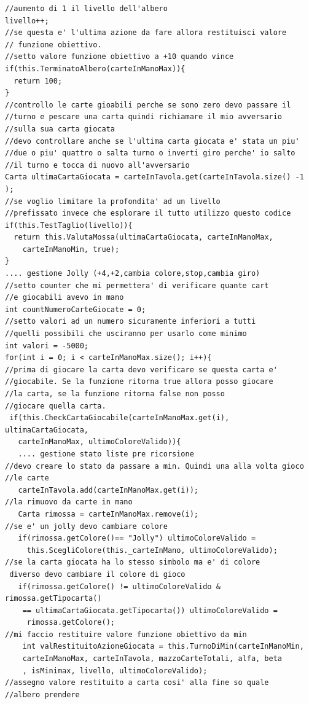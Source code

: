 \begin{lstlisting}
//aumento di 1 il livello dell'albero
livello++;
//se questa e' l'ultima azione da fare allora restituisci valore
// funzione obiettivo.
//setto valore funzione obiettivo a +10 quando vince
if(this.TerminatoAlbero(carteInManoMax)){
  return 100;
}
//controllo le carte gioabili perche se sono zero devo passare il
//turno e pescare una carta quindi richiamare il mio avversario
//sulla sua carta giocata
//devo controllare anche se l'ultima carta giocata e' stata un piu'
//due o piu' quattro o salta turno o inverti giro perche' io salto
//il turno e tocca di nuovo all'avversario
Carta ultimaCartaGiocata = carteInTavola.get(carteInTavola.size() -1 );
//se voglio limitare la profondita' ad un livello
//prefissato invece che esplorare il tutto utilizzo questo codice
if(this.TestTaglio(livello)){
  return this.ValutaMossa(ultimaCartaGiocata, carteInManoMax,
    carteInManoMin, true);
}	
.... gestione Jolly (+4,+2,cambia colore,stop,cambia giro)	
//setto counter che mi permettera' di verificare quante cart
//e giocabili avevo in mano
int countNumeroCarteGiocate = 0;
//setto valori ad un numero sicuramente inferiori a tutti 
//quelli possibili che usciranno per usarlo come minimo
int valori = -5000;
for(int i = 0; i < carteInManoMax.size(); i++){
//prima di giocare la carta devo verificare se questa carta e' 
//giocabile. Se la funzione ritorna true allora posso giocare 
//la carta, se la funzione ritorna false non posso
//giocare quella carta.
 if(this.CheckCartaGiocabile(carteInManoMax.get(i), ultimaCartaGiocata, 
   carteInManoMax, ultimoColoreValido)){
   .... gestione stato liste pre ricorsione
//devo creare lo stato da passare a min. Quindi una alla volta gioco
//le carte
   carteInTavola.add(carteInManoMax.get(i));
//la rimuovo da carte in mano
   Carta rimossa = carteInManoMax.remove(i);
//se e' un jolly devo cambiare colore
   if(rimossa.getColore()== "Jolly") ultimoColoreValido =
     this.ScegliColore(this._carteInMano, ultimoColoreValido);
//se la carta giocata ha lo stesso simbolo ma e' di colore
 diverso devo cambiare il colore di gioco
   if(rimossa.getColore() != ultimoColoreValido & rimossa.getTipocarta()
    == ultimaCartaGiocata.getTipocarta()) ultimoColoreValido =
     rimossa.getColore();
//mi faccio restituire valore funzione obiettivo da min
    int valRestituitoAzioneGiocata = this.TurnoDiMin(carteInManoMin,
    carteInManoMax, carteInTavola, mazzoCarteTotali, alfa, beta
    , isMinimax, livello, ultimoColoreValido); 
//assegno valore restituito a carta cosi' alla fine so quale
//albero prendere

\end{lstlisting}

